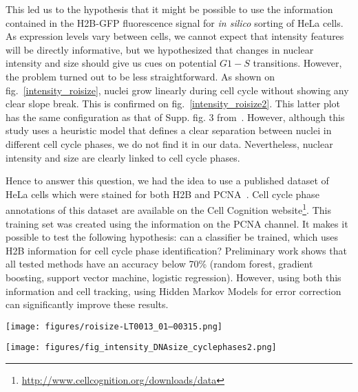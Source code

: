 This led us to the hypothesis that it might be possible to use the
information contained in the H2B-GFP fluorescence signal for
\textit{in silico} sorting of HeLa cells. As expression levels vary
between cells, we cannot expect that intensity features will be
directly informative, but we hypothesized that changes in nuclear intensity
and size should give us cues on potential $G1-S$ transitions. However,
the problem turned out to be less straightforward. 
As shown on
fig.~\ref{intensity_roisize}, nuclei grow linearly during cell cycle
without showing any clear slope break. This is confirmed on
fig.~\ref{intensity_roisize2}. This latter plot has the same
configuration as that of Supp. fig. 3
from~\cite{pmid17401369}. However, although this study uses a
heuristic model that defines a clear separation between nuclei in
different cell cycle phases, we do not find it in our data. 
Nevertheless, nuclear intensity and size are clearly linked to cell cycle phases. 

Hence to answer this question, we had the idea to use a published
dataset of HeLa cells which were stained for both H2B and
PCNA~\cite{cellcognition}. Cell cycle phase annotations of this
dataset are available on the Cell Cognition
website\footnote{\href{http://www.cellcognition.org/downloads/data}{http://www.cellcognition.org/downloads/data}}. This
training set was created using the information on the PCNA channel. It
makes it possible to test the following hypothesis: can a classifier
be trained, which uses H2B information for cell cycle phase
identification? Preliminary work shows that all tested methods have an
accuracy below 70\% (random forest, gradient boosting, support vector
machine, logistic regression). However, using both this information
and cell tracking, using Hidden Markov Models for error correction can
significantly improve these results. 


\begin{figure*}[ht!]
\centerline{\texttt{[image: figures/roisize-LT0013\_01--00315.png]}
}
\caption{Example of the time evolutions of nuclear size ("roisize", top left and bottom) and nuclear intensity ("total intensity", top right) for all complete trajectories of a control experiment from the Mitocheck dataset. As discussed in the text, no clear slope break is seen for most trajectories for any of the two indicators, hence preventing the delimitation of cell cycle phases using only this information.}
\label{intensity_roisize}
\end{figure*}
\begin{figure*}[ht!]
\centerline{\texttt{[image: figures/fig\_intensity\_DNAsize\_cyclephases2.png]}
}
\caption{DNA intensity and size as provided by H2B-GFP information is not sufficient to differenciate between the different cell cycle phases. Data and labelling come from the PCNA dataset.}
\label{intensity_roisize2}
\end{figure*}
\clearpage
